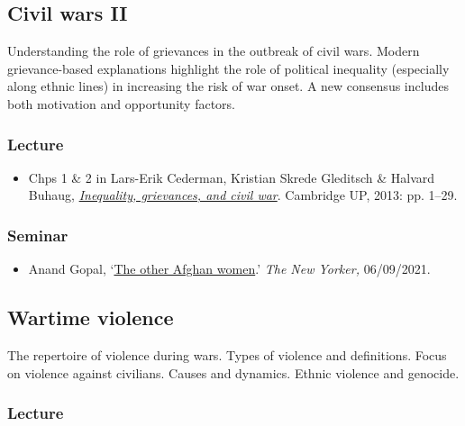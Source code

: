 \documentclass[12pt, a4paper]{article}
\begin{document}
\hline %

\subsection{Civil wars II}\label{cw2}

Understanding the role of grievances in the outbreak of civil wars. Modern grievance-based explanations highlight the role of political inequality (especially along ethnic lines) in increasing the risk of war onset. A new consensus includes both motivation and opportunity factors.

\subsubsection*{Lecture}

\begin{itemize}
\setlength\itemsep{0pt}
\item Chps 1 \& 2 in Lars-Erik Cederman, Kristian Skrede Gleditsch \& Halvard Buhaug, \href{https://doi.org/10.1017/CBO9781139084161}{\textit{Inequality, grievances, and civil war}}. Cambridge UP, 2013: pp. 1--29.
\end{itemize}

\subsubsection*{Seminar}

\begin{itemize}
\setlength\itemsep{0pt}
\item Anand Gopal, `\href{https://www.newyorker.com/magazine/2021/09/13/the-other-afghan-women}{The other Afghan women}.' \textit{The New Yorker,} 06/09/2021.
\end{itemize}

\hline %

\subsection{Wartime violence}\label{wartime_violence}

The repertoire of violence during wars. Types of violence and definitions. Focus on violence against civilians. Causes and dynamics. Ethnic violence and genocide.

\subsubsection*{Lecture}
\end{document}
